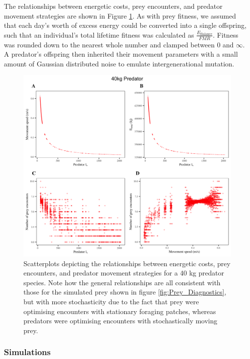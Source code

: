 \documentclass[12pt]{article}
\begin{document}
The relationships between energetic costs, prey encounters, and predator movement strategies are shown in Figure \ref{fig:Pred_Diagnostics}. As with prey fitness, we assumed that each day’s worth of excess energy could be converted into a single offspring, such that an individual's total lifetime fitness was calculated as $\frac{E_{\mathrm{Balance}}}{FMR}$. Fitness was rounded down to the nearest whole number and clamped between 0 and $\infty$. A predator's offspring then inherited their movement parameters with a small amount of Gaussian distributed noise to emulate intergenerational mutation.

\begin{figure}[!h]
\centering
\includegraphics[scale=0.08]{Predator_Diagnostics.png}
\caption{Scatterplots depicting the relationships between energetic costs, prey encounters, and predator movement strategies for a 40 kg predator species. Note how the general relationships are all consistent with those for the simulated prey shown in figure \ref{fig:Prey_Diagnostics}, but with more stochasticity due to the fact that prey were optimising encounters with stationary foraging patches, whereas predators were optimising encounters with stochastically moving prey.}
\label{fig:Pred_Diagnostics}
\end{figure}



\subsubsection*{Simulations}
\end{document}
